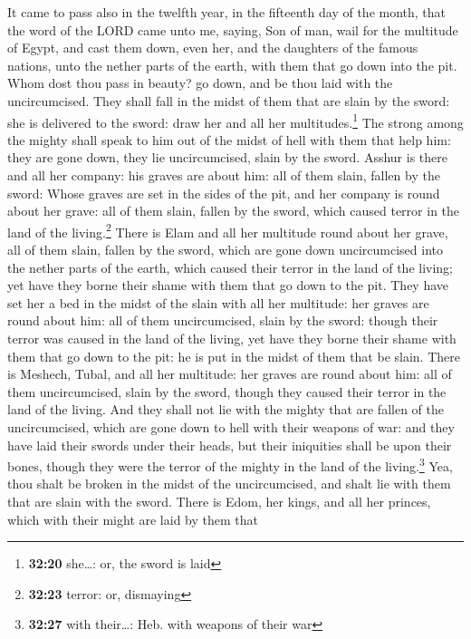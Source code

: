  It came to pass also in the twelfth year, in the
fifteenth day of the month, that the word of the LORD came unto me,
saying,  Son of man, wail for the multitude of Egypt, and
cast them down, even her, and the daughters of the famous nations, unto
the nether parts of the earth, with them that go down into the pit.
 Whom dost thou pass in beauty? go down, and be thou laid
with the uncircumcised.  They shall fall in the midst of
them that are slain by the sword: she is delivered to the sword: draw
her and all her multitudes.\footnote{\textbf{32:20} she\ldots: or, the
  sword is laid}  The strong among the mighty shall speak
to him out of the midst of hell with them that help him: they are gone
down, they lie uncircumcised, slain by the sword.  Asshur
is there and all her company: his graves are about him: all of them
slain, fallen by the sword:  Whose graves are set in the
sides of the pit, and her company is round about her grave: all of them
slain, fallen by the sword, which caused terror in the land of the
living.\footnote{\textbf{32:23} terror: or, dismaying} 
There is Elam and all her multitude round about her grave, all of them
slain, fallen by the sword, which are gone down uncircumcised into the
nether parts of the earth, which caused their terror in the land of the
living; yet have they borne their shame with them that go down to the
pit.  They have set her a bed in the midst of the slain
with all her multitude: her graves are round about him: all of them
uncircumcised, slain by the sword: though their terror was caused in the
land of the living, yet have they borne their shame with them that go
down to the pit: he is put in the midst of them that be slain.
 There is Meshech, Tubal, and all her multitude: her
graves are round about him: all of them uncircumcised, slain by the
sword, though they caused their terror in the land of the living.
 And they shall not lie with the mighty that are fallen
of the uncircumcised, which are gone down to hell with their weapons of
war: and they have laid their swords under their heads, but their
iniquities shall be upon their bones, though they were the terror of the
mighty in the land of the living.\footnote{\textbf{32:27} with
  their\ldots: Heb. with weapons of their war}  Yea, thou
shalt be broken in the midst of the uncircumcised, and shalt lie with
them that are slain with the sword.  There is Edom, her
kings, and all her princes, which with their might are laid by them that

